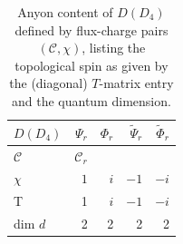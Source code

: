\documentclass[two column]{article}
\begin{document}
\begin{table}
\vspace{0.5cm}
\begin{subtable}{\textwidth}
\raggedright
\begin{tabular}{l|rrrr}
$D(D_4)$  & $\Psi_{r}$ &  $\Phi_{r}$ & $\tilde{\Psi}_{r}$ & $\tilde{\Phi}_{r}$ \\ \hline
$\mathcal C$    & $\mathcal C_r$    &            &    &             \\ %
$\chi$ & $1$    & $ i$              & $-1$     & $- i$   \\           %
\hline
T  & 1 & $i$ & $-1$ & $-i$ \\
dim $d$ & 2 & 2 & 2 & 2
\end{tabular}
\end{subtable} 
\caption{  Anyon content of $D(D_4)$ defined by flux-charge pairs $(\mathcal C,\chi)$, listing the topological spin as given by the (diagonal) $T$-matrix entry and the quantum dimension. }\label{tab:anyons}
\end{table}


%
%
\end{document}
